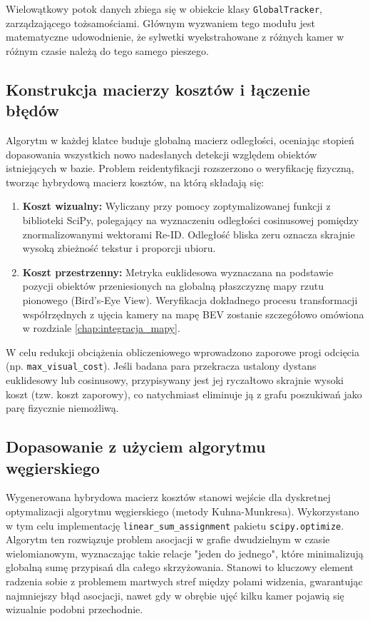 Wielowątkowy potok danych zbiega się w obiekcie klasy \texttt{GlobalTracker}, zarządzającego
tożsamościami. Głównym wyzwaniem tego modułu jest matematyczne udowodnienie, że sylwetki
wyekstrahowane z różnych kamer w różnym czasie należą do tego samego pieszego.

\subsection{Konstrukcja macierzy kosztów i łączenie błędów}

Algorytm w każdej klatce buduje globalną macierz odległości, oceniając stopień dopasowania
wszystkich nowo nadesłanych detekcji względem obiektów istniejących w bazie. Problem
reidentyfikacji rozszerzono o weryfikację fizyczną, tworząc hybrydową macierz kosztów, na którą
składają się:
\begin{enumerate}
  \item \textbf{Koszt wizualny:} Wyliczany przy pomocy zoptymalizowanej funkcji z biblioteki SciPy, polegający na wyznaczeniu odległości cosinusowej pomiędzy znormalizowanymi wektorami Re-ID. Odległość bliska zeru oznacza skrajnie wysoką zbieżność tekstur i proporcji ubioru.
  \item \textbf{Koszt przestrzenny:} Metryka euklidesowa wyznaczana na podstawie pozycji obiektów przeniesionych na globalną płaszczyznę mapy rzutu pionowego (Bird's-Eye View). Weryfikacja dokładnego procesu transformacji współrzędnych z ujęcia kamery na mapę BEV zostanie szczegółowo omówiona w rozdziale \ref{chap:integracja_mapy}.
\end{enumerate}

W celu redukcji obciążenia obliczeniowego wprowadzono zaporowe progi odcięcia (np.
\texttt{max\_visual\_cost}). Jeśli badana para przekracza ustalony dystans euklidesowy lub
cosinusowy, przypisywany jest jej ryczałtowo skrajnie wysoki koszt (tzw. koszt zaporowy), co
natychmiast eliminuje ją z grafu poszukiwań jako parę fizycznie niemożliwą.

\subsection{Dopasowanie z użyciem algorytmu węgierskiego}

Wygenerowana hybrydowa macierz kosztów stanowi wejście dla dyskretnej optymalizacji algorytmu
węgierskiego (metody Kuhna-Munkresa). Wykorzystano w tym celu implementację
\texttt{linear\_sum\_assignment} pakietu \texttt{scipy.optimize}. Algorytm ten rozwiązuje problem
asocjacji w grafie dwudzielnym w czasie wielomianowym, wyznaczając takie relacje "jeden do
jednego", które minimalizują globalną sumę przypisań dla całego skrzyżowania. Stanowi to kluczowy
element radzenia sobie z problemem martwych stref między polami widzenia, gwarantując najmniejszy
błąd asocjacji, nawet gdy w obrębie ujęć kilku kamer pojawią się wizualnie podobni przechodnie.

